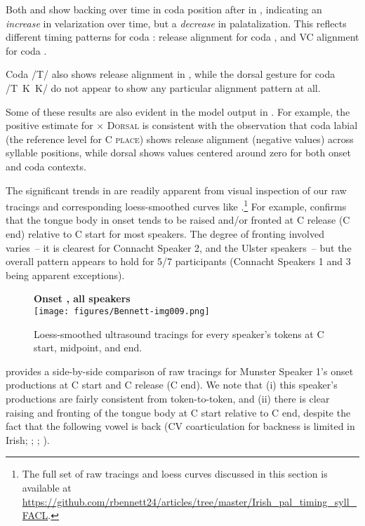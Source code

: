 \documentclass[output=paper,colorlinks,citecolor=brown]{langscibook}
\newcommand{\pal}{\ipa{ʲ}}
\newcommand{\vel}{\ipa{ˠ}}
\begin{document}
Both  and  show backing over time in coda position after  in , indicating an \emph{increase} in velarization over time, but a \emph{decrease} in palatalization. This reflects different timing patterns for coda : release alignment for coda , and VC alignment for coda .
 
Coda /T\pal/ also shows release alignment in , while the dorsal gesture for coda /T\vel\ K\pal\ K\vel/ do not appear to show any particular alignment pattern at all.

Some of these results are also evident in the model output in . For example, the positive estimate for \textsc{{\normalfont\ipa{/C\vel/}} $\times$ Dorsal} is consistent with the observation that coda labial \ipa{/P\vel/} (the reference level for \textsc{C place}) shows release alignment (negative values) across syllable positions, while dorsal \ipa{/K\vel/} shows values centered around zero for both onset and coda contexts.

The significant trends in  are readily apparent from visual inspection of our raw tracings and corresponding loess-smoothed curves like .\footnote{The full set of raw tracings and loess curves discussed in this section is available at \url{https://github.com/rbennett24/articles/tree/master/Irish_pal_timing_syll_FACL}.} For example,  confirms that the tongue body in onset  tends to be raised and/or fronted at C release (C end) relative to C start for most speakers. The degree of fronting involved varies~-- it is clearest for Connacht Speaker 2, and the Ulster speakers~-- but the overall pattern appears to hold for 5/7 participants (Connacht Speakers 1 and 3 being apparent exceptions).

\begin{figure}
    \centering
    \textbf{Onset , all speakers}\\
    \texttt{[image: figures/Bennett-img009.png]}
    \caption{Loess-smoothed ultrasound tracings for every speaker's  tokens at C start, midpoint, and end.}
    \label{fig:loess-PJu-all}
\end{figure}


 provides a side-by-side comparison of raw tracings for Munster Speaker 1's onset  productions at C start and C release (C end). We note that (i) this speaker's productions are fairly consistent from token-to-token, and (ii) there is clear raising and fronting of the tongue body at C start relative to C end, despite the fact that the following vowel is back  (CV coarticulation for backness is limited in Irish; \cite{NiChasaide_Fealy1991_Irish_EPG}; \cite{Bennett_etal2018_Conamara_ultrasound}; \citeyear{Bennett_etal2023_jphon_submission}).
\end{document}
